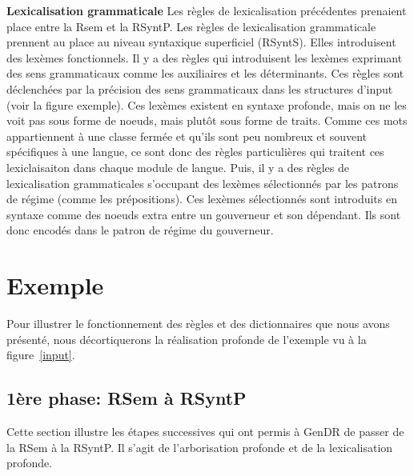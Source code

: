 \textbf{Lexicalisation grammaticale}
Les règles de lexicalisation précédentes prenaient place entre la Rsem et la RSyntP. Les règles de lexicalisation grammaticale prennent au place au niveau syntaxique superficiel (RSyntS). Elles introduisent des lexèmes fonctionnels. Il y a des règles qui introduisent les lexèmes exprimant des sens grammaticaux comme les auxiliaires et les déterminants. Ces règles sont déclenchées par la précision des sens grammaticaux dans les structures d'input (voir la figure exemple). Ces lexèmes existent en syntaxe profonde, mais on ne les voit pas sous forme de noeuds, mais plutôt sous forme de traits. Comme ces mots appartiennent à une classe fermée et qu'ils sont peu nombreux et souvent spécifiques à une langue, ce sont donc des règles particulières qui traitent ces lexiclaisaiton dans chaque module de langue. Puis, il y a des règles de lexicalisation grammaticales s'occupant des lexèmes sélectionnés par les patrons de régime (comme les prépositions). Ces lexèmes sélectionnés sont introduits en syntaxe comme des noeuds extra entre un gouverneur et son dépendant. Ils sont donc encodés dans le patron de régime du gouverneur.


\section{Exemple}\label{secexemple}

Pour illustrer le fonctionnement des règles et des dictionnaires que nous avons présenté, nous décortiquerons la réalisation profonde de l'exemple vu à la figure~\ref{input}.

\subsection{1ère phase: RSem à RSyntP}
Cette section illustre les étapes successives qui ont permis à GenDR de passer de la \ac{RSem} à la \ac{RSyntP}. Il s'agit de l'arborisation profonde et de la lexicalisation profonde.

